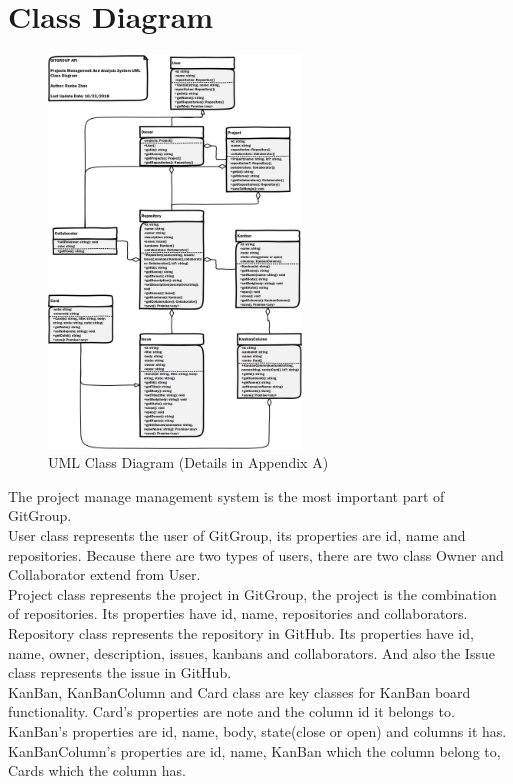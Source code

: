 \documentclass[12pt,a4paper]{report}
\begin{document}
\section{Class Diagram}
\begin{figure}[H]
	\centering
	\includegraphics[width=0.6\textwidth]{./pics/ClassDiagram.png}
	\caption{UML Class Diagram (Details in Appendix A)}
\end{figure}
The project manage management system is the most important part of GitGroup.\\
User class represents the user of GitGroup, its properties are id, name and repositories. Because there are two types of users, there are two class Owner and Collaborator extend from User.\\
Project class represents the project in GitGroup, the project is the combination of repositories. Its properties have id, name, repositories and collaborators.\\
Repository class represents the repository in GitHub. Its properties have id, name, owner, description, issues, kanbans and collaborators. And also the Issue class represents the issue in GitHub.\\
KanBan, KanBanColumn and Card class are key classes for KanBan board functionality. Card's properties are note and the column id it belongs to. KanBan's properties are id, name, body, state(close or open) and columns it has. KanBanColumn's properties are id, name, KanBan which the column belong to, Cards which the column has.
\end{document}
